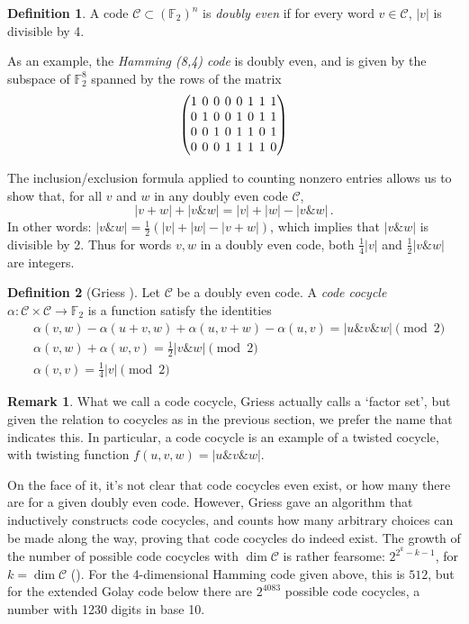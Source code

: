 \documentclass{article}
\theoremstyle{plain}
\theoremstyle{definition}
\newtheorem*{definition}{Definition}
\newtheorem*{remark}{Remark}
\def \cC {\mathcal{C}}
\def \FF {\mathbb{F}}
\newcommand{\AND}{\mathbin{\texttt{\&}}}
\begin{document}
\begin{definition}
A code $\cC \subset (\FF_2)^n$ is \emph{doubly even} if for every word $v\in \cC$, $|v|$ is divisible by 4. 
\end{definition}


As an example, the \emph{Hamming (8,4) code} is doubly even, and is given by the subspace of $\FF_2^8$ spanned by the rows of the matrix
\[
\begingroup %
\setlength\arraycolsep{2pt}
\begin{pmatrix}
1&0&0&0&0&1&1&1\\
0&1&0&0&1&0&1&1\\
0&0&1&0&1&1&0&1\\
0&0&0&1&1&1&1&0
\end{pmatrix}
\endgroup
\]

The inclusion/exclusion formula applied to counting nonzero entries allows us to show that, for all $v$ and $w$ in any doubly even code $\cC$,
\[
	|v+w| + |v\AND w| = |v| + |w| - |v\AND w|\,.
\]
In other words: $|v\AND w| = \frac12(|v| + |w| - |v+w|)$, which implies that $|v\AND w|$ is divisible by 2.
Thus for words $v,w$ in a doubly even code, both $\frac14|v|$ and $\frac12|v\AND w|$ are integers.

\begin{definition}[Griess \cite{Griess}]
Let $\cC$ be a doubly even code. 
A \emph{code cocycle} $\alpha\colon \cC \times \cC \to \FF_2$ is a  function satisfy the identities
\begin{align}
& \alpha(v,w)-\alpha(u+v,w)+\alpha(u,v+w)-\alpha(u,v) =|u\AND v \AND w| \pmod 2 \label{eq: code cocycle 1}\\
& \alpha(v,w)+\alpha(w,v) = {}  \tfrac12|v\AND w| \pmod 2 \label{eq: code cocycle 2}\\
& \alpha(v,v) = {}  \tfrac14|v| \pmod 2\label{eq: code cocycle 3}
\end{align}
\end{definition}

\begin{remark}
What we call a code cocycle, Griess actually calls a `factor set', but given the relation to cocycles as in the previous section, we prefer the name that indicates this.
In particular, a code cocycle is an example of a twisted cocycle, with twisting function $f(u,v,w)=|u\AND v \AND w|$.
\end{remark}

On the face of it, it's not clear that code cocycles even exist, or how many there are for a given doubly even code. 
However, Griess gave an algorithm that inductively constructs code cocycles, and counts how many arbitrary choices can be made along the way, proving that code cocycles do indeed exist.
The growth of the number of possible code cocycles with $\dim \cC$ is rather fearsome: $2^{2^k-k-1}$, for $k=\dim \cC$ (\cite[Theorem 10]{Griess}).
For the 4-dimensional Hamming code given above, this is $512$, but for the extended Golay code below there are $2^{4083}$ possible code cocycles, a number with 1230 digits in base 10.
\end{document}

